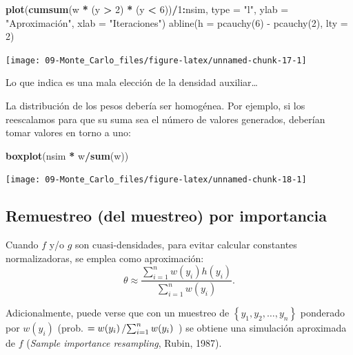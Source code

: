 \documentclass[]{book}
\newenvironment{Shaded}{\begin{snugshade}}{\end{snugshade}}
\newcommand{\KeywordTok}[1]{\textcolor[rgb]{0.13,0.29,0.53}{\textbf{#1}}}
\newcommand{\DataTypeTok}[1]{\textcolor[rgb]{0.13,0.29,0.53}{#1}}
\newcommand{\DecValTok}[1]{\textcolor[rgb]{0.00,0.00,0.81}{#1}}
\newcommand{\StringTok}[1]{\textcolor[rgb]{0.31,0.60,0.02}{#1}}
\newcommand{\OperatorTok}[1]{\textcolor[rgb]{0.81,0.36,0.00}{\textbf{#1}}}
\newcommand{\NormalTok}[1]{#1}
\theoremstyle{definition}
\theoremstyle{definition}
\theoremstyle{definition}
\theoremstyle{remark}
\begin{document}
\begin{Shaded}
\begin{Highlighting}[]
\KeywordTok{plot}\NormalTok{(}\KeywordTok{cumsum}\NormalTok{(w }\OperatorTok{*}\StringTok{ }\NormalTok{(y }\OperatorTok{>}\StringTok{ }\DecValTok{2}\NormalTok{) }\OperatorTok{*}\StringTok{ }\NormalTok{(y }\OperatorTok{<}\StringTok{ }\DecValTok{6}\NormalTok{))}\OperatorTok{/}\DecValTok{1}\OperatorTok{:}\NormalTok{nsim, }\DataTypeTok{type =} \StringTok{"l"}\NormalTok{, }\DataTypeTok{ylab =} \StringTok{"Aproximación", xlab = "}\NormalTok{Iteraciones}\StringTok{")}
\StringTok{abline(h = pcauchy(6) - pcauchy(2), lty = 2)}
\end{Highlighting}
\end{Shaded}

\begin{center}\texttt{[image: 09-Monte\_Carlo\_files/figure-latex/unnamed-chunk-17-1]} \end{center}

Lo que indica es una mala elección de la densidad auxiliar\ldots{}

La distribución de los pesos debería ser homogénea. Por ejemplo, si los
reescalamos para que su suma sea el número de valores generados,
deberían tomar valores en torno a uno:

\begin{Shaded}
\begin{Highlighting}[]
\KeywordTok{boxplot}\NormalTok{(nsim }\OperatorTok{*}\StringTok{ }\NormalTok{w}\OperatorTok{/}\KeywordTok{sum}\NormalTok{(w))  }
\end{Highlighting}
\end{Shaded}

\begin{center}\texttt{[image: 09-Monte\_Carlo\_files/figure-latex/unnamed-chunk-18-1]} \end{center}

\subsection{Remuestreo (del muestreo) por
importancia}\label{remuestreo-del-muestreo-por-importancia}

Cuando \(f\) y/o \(g\) son cuasi-densidades, para evitar calcular
constantes normalizadoras, se emplea como aproximación:
\[\theta \approx \frac{\sum\limits_{i=1}^{n}w(y_{i})h\left( y_{i}\right) }{ \sum\limits_{i=1}^{n}w(y_{i})}.\]

Adicionalmente, puede verse que con un muestreo de
\(\left\{y_{1},y_{2},\ldots ,y_{n}\right\}\) ponderado por \(w(y_{i})\)
(prob. \(=w(y_{i})\left/ \sum\nolimits_{i=1}^{n}w(y_{i}) \right.\) ) se
obtiene una simulación aproximada de \(f\) (\emph{Sample importance
resampling}, Rubin, 1987).
\end{document}
